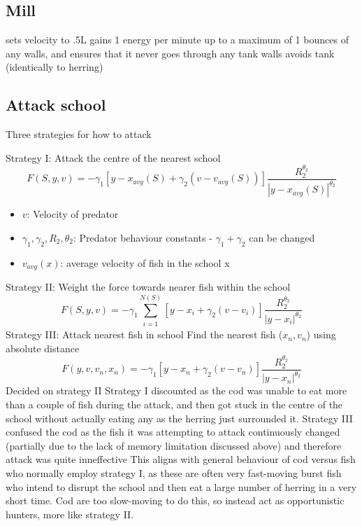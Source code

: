 \subsection{Mill}
sets velocity to .5L
gains 1 energy per minute up to a maximum of 1
bounces of any walls, and ensures that it never goes through any tank walls
avoids tank (identically to herring)
\subsection{Attack school}
Three strategies for how to attack\par
Strategy I: Attack the centre of the nearest school
\begin{equation}
    F(S,y,v) = -\gamma_1[y-x_{avg}(S)+\gamma_2(v-v_{avg}(S))]\frac{R_2^{\theta_2}}{|y-x_{avg}(S)|^{\theta_2}}
\end{equation}
\begin{itemize}
    \item $v$: Velocity of predator
    \item $\gamma_1,\gamma_2,R_2,\theta_2$: Predator behaviour constants - $\gamma_1+\gamma_2$ can be changed
    \item     $v_{avg}(x)$: average velocity of fish in the school x

\end{itemize}
Strategy II: Weight the force towards nearer fish within the school
\begin{equation}
    F(S,y,v) = -\gamma_1 \sum_{\substack{i=1}}^{N(S)} [y-x_i+\gamma_2(v-v_i)]\frac{R_2^{\theta_2}}{|y-x_i|^{\theta_2}}
\end{equation}
Strategy III: Attack nearest fish in school
Find the nearest fish ($x_n,v_n$) using absolute distance
\begin{equation}
    F(y,v,v_n,x_n) = -\gamma_1[y-x_n+\gamma_2(v-v_n)]\frac{R_2^{\theta_2}}{|y-x_n|^{\theta_2}}
\end{equation}
Decided on strategy II
Strategy I discounted as the cod was unable to eat more than a couple of fish during the attack, and then got stuck in the centre of the school without actually eating any as the herring just surrounded it.
Strategy III confused the cod as the fish it was attempting to attack continuously changed (partially due to the lack of memory limitation discussed above) and therefore attack was quite inneffective
This aligns with general behaviour of cod versus fish who normally employ strategy I, as these are often very fast-moving burst fish who intend to disrupt the school and then eat a large number of herring in a very short time. Cod are too slow-moving to do this, so instead act as opportunistic hunters, more like strategy II.

